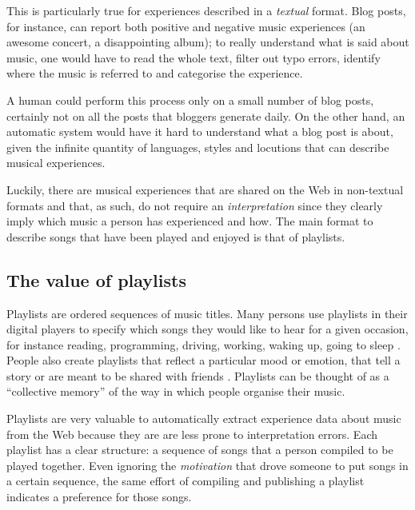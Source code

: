 This is particularly true for experiences described in a \emph{textual} format.
Blog posts, for instance, can report both positive and negative music experiences (an awesome concert, a disappointing album);
to really understand what is said about music, one would have to read the whole text, filter out typo errors, identify where the music is referred to and categorise the experience.

A human could perform this process only on a small number of blog posts, certainly not on all the posts that bloggers generate daily.
On the other hand, an automatic system would have it hard to understand what a blog post is about, given the infinite quantity of languages, styles and locutions that can describe musical experiences. 

Luckily, there are musical experiences that are shared on the Web in non-textual formats and that, as such, do not require an \emph{interpretation} since they clearly imply which music a person has experienced and how.
The main format to describe songs that have been played and enjoyed is that of playlists.



\subsection{The value of playlists} %
\label{sub:the_value_of_playlists}

Playlists are ordered sequences of music titles.
Many persons use playlists in their digital players to specify which songs they would like to hear for a given occasion, for instance reading, programming, driving, working, waking up, going to sleep \cite{Vignoli04}.
People also create playlists that reflect a particular mood or emotion, that tell a story or are meant to be shared with friends \cite{Cunningham04}.
Playlists can be thought of as a ``collective memory'' \cite{vanDijck06} of the way in which people organise their music.

Playlists are very valuable to automatically extract experience data about music from the Web because they are are less prone to interpretation errors. Each playlist has a clear structure: a sequence of songs that a person compiled to be played together. Even ignoring the \emph{motivation} that drove someone to put songs in a certain sequence, the same effort of compiling and publishing a playlist indicates a preference for those songs.


